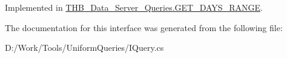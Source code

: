 Implemented in \mbox{\hyperlink{class_t_h_b___data___server___queries_1_1_g_e_t___d_a_y_s___r_a_n_g_e_a2b21ca7e9599161544424cd0f7e55ef4}{T\+H\+B\+\_\+\+Data\+\_\+\+Server\+\_\+\+Queries.\+G\+E\+T\+\_\+\+D\+A\+Y\+S\+\_\+\+R\+A\+N\+GE}}.



The documentation for this interface was generated from the following file\+:\begin{DoxyCompactItemize}
\item 
D\+:/\+Work/\+Tools/\+Uniform\+Queries/I\+Query.\+cs\end{DoxyCompactItemize}
